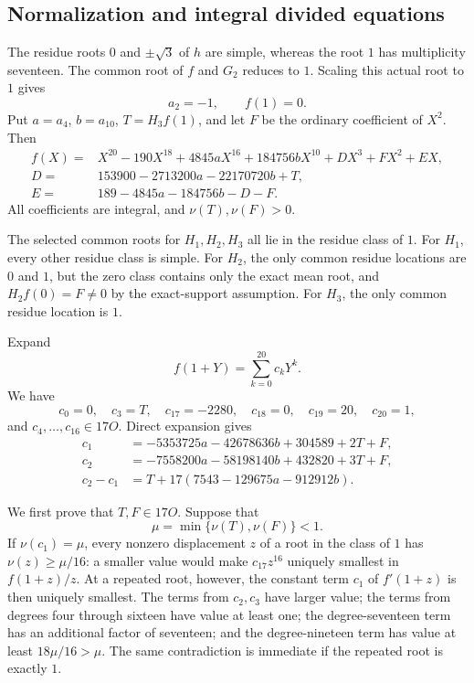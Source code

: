 \documentclass[
  british,
  10pt,
  a4paper,
]{article}
\begin{document}
\subsection{Normalization and integral divided
equations}\label{normalization-and-integral-divided-equations}

The residue roots \(0\) and \(\pm\sqrt3\) of \(h\) are simple, whereas
the root \(1\) has multiplicity seventeen. The common root of \(f\) and
\(G_2\) reduces to \(1\). Scaling this actual root to \(1\) gives \[
a_2=-1,\qquad f(1)=0.
\] Put \(a=a_4\), \(b=a_{10}\), \(T=H_3f(1)\), and let \(F\) be the
ordinary coefficient of \(X^2\). Then \[
\begin{aligned}
f(X)={}&X^{20}-190X^{18}+4845aX^{16}+184756bX^{10}
       +DX^3+FX^2+EX,\\
D={}&153900-2713200a-22170720b+T,\\
E={}&189-4845a-184756b-D-F.
\end{aligned}
\tag{R2.1}
\] All coefficients are integral, and \(\nu(T),\nu(F)>0\).

The selected common roots for \(H_1,H_2,H_3\) all lie in the residue
class of \(1\). For \(H_1\), every other residue class is simple. For
\(H_2\), the only common residue locations are \(0\) and \(1\), but the
zero class contains only the exact mean root, and \(H_2f(0)=F\ne0\) by
the exact-support assumption. For \(H_3\), the only common residue
location is \(1\).

Expand \[
f(1+Y)=\sum_{k=0}^{20}c_kY^k.
\] We have \[
c_0=0,\quad c_3=T,\quad c_{17}=-2280,\quad c_{18}=0,
\quad c_{19}=20,\quad c_{20}=1,
\] and \(c_4,\ldots,c_{16}\in17O\). Direct expansion gives \[
\begin{aligned}
c_1&=-5353725a-42678636b+304589+2T+F,\\
c_2&=-7558200a-58198140b+432820+3T+F,\\
c_2-c_1&=T+17(7543-129675a-912912b).
\end{aligned}
\tag{R2.2}
\]

We first prove that \(T,F\in17O\). Suppose that \[
\mu=\min\{\nu(T),\nu(F)\}<1.
\] If \(\nu(c_1)=\mu\), every nonzero displacement \(z\) of a root in
the class of \(1\) has \(\nu(z)\ge\mu/16\): a smaller value would make
\(c_{17}z^{16}\) uniquely smallest in \(f(1+z)/z\). At a repeated root,
however, the constant term \(c_1\) of \(f'(1+z)\) is then uniquely
smallest. The terms from \(c_2,c_3\) have larger value; the terms from
degrees four through sixteen have value at least one; the
degree-seventeen term has an additional factor of seventeen; and the
degree-nineteen term has value at least \(18\mu/16>\mu\). The same
contradiction is immediate if the repeated root is exactly \(1\).
\end{document}
